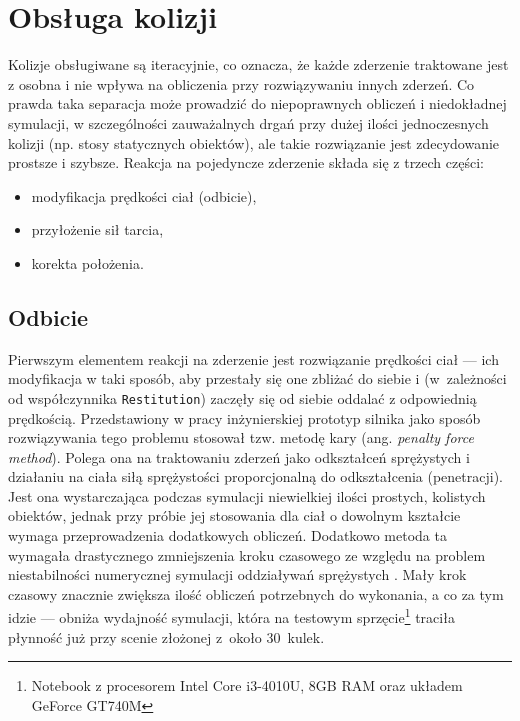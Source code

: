 



\section{Obsługa kolizji}
Kolizje obsługiwane są iteracyjnie, co oznacza, że każde zderzenie traktowane jest z osobna i nie wpływa na obliczenia przy rozwiązywaniu innych zderzeń. Co prawda taka separacja może prowadzić do niepoprawnych obliczeń i niedokładnej symulacji, w szczególności zauważalnych drgań przy dużej ilości jednoczesnych kolizji (np. stosy statycznych obiektów), ale takie rozwiązanie jest zdecydowanie prostsze i szybsze. 
Reakcja na pojedyncze zderzenie składa się z trzech części:
\begin{itemize}
	\item modyfikacja prędkości ciał (odbicie),
	\item przyłożenie sił tarcia,
	\item korekta położenia.
\end{itemize}

\subsection{Odbicie}
Pierwszym elementem reakcji na zderzenie jest rozwiązanie prędkości ciał --- ich modyfikacja w taki sposób, aby przestały się one zbliżać do siebie i (w~zależności od współczynnika \verb|Restitution|) zaczęły się od siebie oddalać z odpowiednią prędkością. Przedstawiony w pracy inżynierskiej prototyp silnika jako sposób rozwiązywania tego problemu stosował tzw. metodę kary (ang. \textit{penalty force method})\cite{bib:mirtich-penalty-impulse}. Polega ona na traktowaniu zderzeń jako odkształceń sprężystych i działaniu na ciała siłą sprężystości proporcjonalną do odkształcenia (penetracji). Jest ona wystarczająca podczas symulacji niewielkiej ilości prostych, kolistych obiektów, jednak przy próbie jej stosowania dla ciał o dowolnym kształcie wymaga przeprowadzenia dodatkowych obliczeń. Dodatkowo metoda ta wymagała drastycznego zmniejszenia kroku czasowego ze względu na problem niestabilności numerycznej symulacji oddziaływań sprężystych \cite[6.3.1]{bib:millington}. Mały krok czasowy znacznie zwiększa ilość obliczeń potrzebnych do wykonania, a co za tym idzie --- obniża wydajność symulacji, która na testowym sprzęcie\footnote{Notebook z procesorem Intel Core i3-4010U, 8GB RAM oraz układem GeForce GT740M} traciła płynność już przy scenie złożonej z~około 30~kulek.

